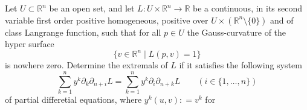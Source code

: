 Let $ U\subset\mathbb R^n$ be an open set, and let $ L: U\times\mathbb R^n\to\mathbb R$ be a continuous, in its second variable first order positive homogeneous, positive over $ U\times (\mathbb R^n\setminus\{0\})$ and of class Langrange function, such that for all $ p\in U$ the Gauss-curvature of the hyper surface
\[ \{ v\in\mathbb R^n \mid L(p,v) = 1 \}\]
is nowhere zero. Determine the extremals of $ L$ if it satisfies the following system
\[ \sum_{k = 1}^n y^k\partial_k\partial_{n + i}L = \sum_{k = 1}^n y^k\partial_i\partial_{n + k} L \qquad (i\in\{1,\dots,n\})\]
of partial differetial equations, where $ y^k(u,v) : = v^k$ for  